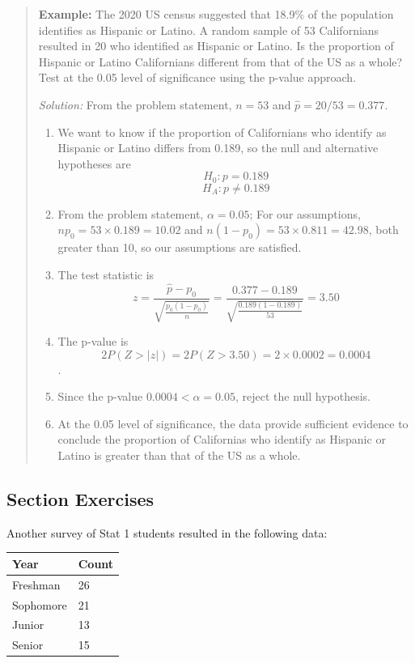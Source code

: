 \documentclass[
]{book}
\providecommand{\tightlist}{%
  \setlength{\itemsep}{0pt}\setlength{\parskip}{0pt}}
\begin{document}
\begin{quote}
\textbf{Example:} The 2020 US census suggested that 18.9\% of the population identifies as Hispanic or Latino. A random sample of 53 Californians resulted in 20 who identified as Hispanic or Latino. Is the proportion of Hispanic or Latino Californians different from that of the US as a whole? Test at the 0.05 level of significance using the p-value approach.

\emph{Solution:} From the problem statement, \(n=53\) and \(\hat{p} = 20/53 = 0.377\).

\begin{enumerate}
\def\labelenumi{\arabic{enumi}.}
\tightlist
\item
  We want to know if the proportion of Californians who identify as Hispanic or Latino differs from 0.189, so the null and alternative hypotheses are \[H_0: p = 0.189\] \[H_A: p \ne 0.189\]
\item
  From the problem statement, \(\alpha = 0.05\); For our assumptions, \(np_0 = 53\times 0.189 = 10.02\) and \(n(1-p_0) = 53\times0.811=42.98\), both greater than 10, so our assumptions are satisfied.
\item
  The test statistic is \[z = \frac{\hat{p} - p_0}{\sqrt{\frac{p_0(1-p_0)}{n}}} = \frac{0.377 - 0.189}{\sqrt{\frac{0.189(1-0.189)}{53}}} = 3.50\]
\item
  The p-value is \[2P(Z > |z|) = 2P(Z > 3.50) = 2\times 0.0002 = 0.0004\].
\item
  Since the p-value \(0.0004 < \alpha = 0.05\), reject the null hypothesis.
\item
  At the 0.05 level of significance, the data provide sufficient evidence to conclude the proportion of Californias who identify as Hispanic or Latino is greater than that of the US as a whole.
\end{enumerate}
\end{quote}

\subsection*{Section Exercises}\label{section-exercises-26}

Another survey of Stat 1 students resulted in the following data:

\begin{longtable}[]{@{}ll@{}}
\toprule\noalign{}
Year & Count \\
\midrule\noalign{}
\endhead
\bottomrule\noalign{}
\endlastfoot
Freshman & 26 \\
Sophomore & 21 \\
Junior & 13 \\
Senior & 15 \\
\end{longtable}
\end{document}
